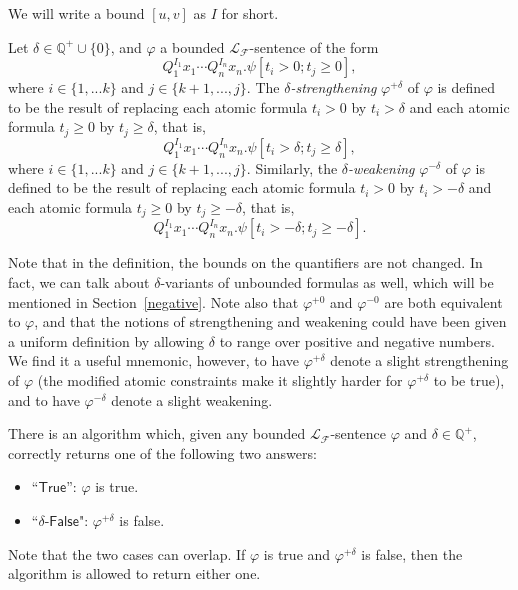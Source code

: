 \documentclass[envcountsect]{llncs}
\begin{document}
We will write a bound $[u,v]$ as $I$ for short. 

\begin{definition}
Let $\delta\in \mathbb{Q}^+\cup\{0\}$, and $\varphi$ a bounded
$\mathcal{L}_{\mathcal{F}}$-sentence  of the form
$$Q_1^{I_1}x_1\cdots Q_n^{I_n}x_n.\psi[t_i>0; t_j\geq 0],$$
where $i\in\{1,...k\}$ and $j\in\{k+1,...,j\}$. The {\em $\delta$-strengthening}
 $\varphi^{+\delta}$ of $\varphi$ is defined to be the result of replacing each
atomic formula $t_i > 0$ by $t_i > \delta$ and each atomic formula $t_j \geq 0$
by $t_j \geq \delta$, that is,
$$Q_1^{I_1}x_1\cdots Q_n^{I_n}x_n.\psi[t_i>\delta; t_j\geq \delta],$$
where $i\in\{1,...k\}$ and $j\in\{k+1,...,j\}$.
Similarly, the {\em $\delta$-weakening} $\varphi^{-\delta}$ of $\varphi$ is
defined to  be the result of replacing each atomic formula $t_i > 0$ by $t_i >
-\delta$ and each atomic formula $t_j \geq 0$ by $t_j \geq -\delta$, that is,
$$Q_1^{I_1}x_1\cdots Q_n^{I_n}x_n.\psi[t_i>-\delta; t_j\geq -\delta].$$
\end{definition}

Note that in the definition, the bounds on the quantifiers are not changed. In 
fact, we can talk about $\delta$-variants of unbounded formulas as well, which
will be mentioned in Section~\ref{negative}. Note also that $\varphi^{+0}$ and
$\varphi^{-0}$ are both equivalent to $\varphi$, and that the notions of
strengthening and weakening could have been given a uniform definition by
allowing $\delta$ to range over positive and negative numbers. We find it a
useful mnemonic, however, to have $\varphi^{+\delta}$ denote a slight
strengthening of $\varphi$ (the modified atomic constraints make it slightly
harder for $\varphi^{+\delta}$ to be true), and to have $\varphi^{-\delta}$
denote a slight weakening.

\begin{theorem}\label{main}
There is an algorithm which, given any bounded
$\mathcal{L}_{\mathcal{F}}$-sentence  $\varphi$ and $\delta\in \mathbb{Q}^+$,
correctly returns one of the following two answers:
\begin{itemize}
\item ``$\mathsf{True}$'': $\varphi$ is true. 
\item ``$\delta$-$\mathsf{False}$": $\varphi^{+\delta}$ is false. 
\end{itemize}
\end{theorem}

Note that the two cases can overlap. If $\varphi$ is true and
$\varphi^{+\delta}$  is false, then the algorithm is allowed to return either
one. 
\end{document}
